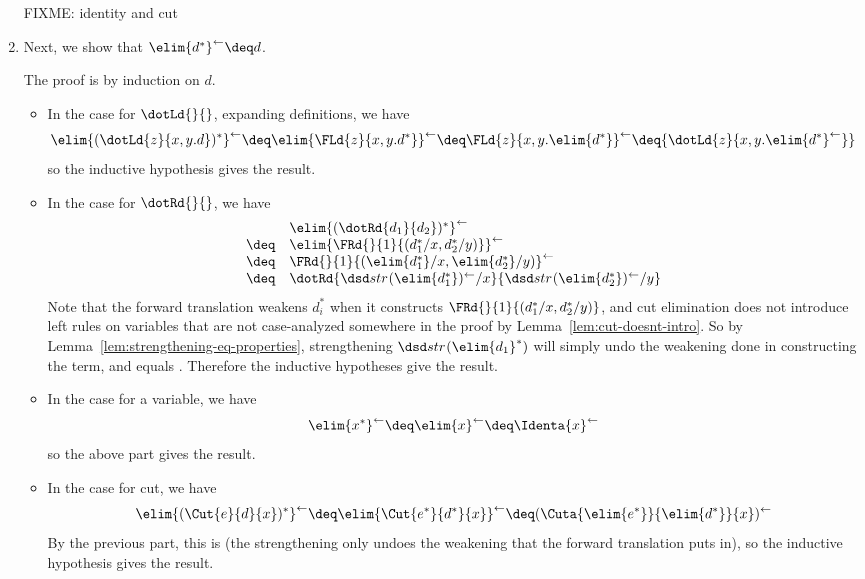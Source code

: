 \begin{enumerate}
FIXME: identity and cut

\item Next, we show that $\backtrf{{\elim{d^*}}} \deq d$.

The proof is by induction on $d$.  

\begin{itemize}
\item In the case for $\dotLd{}{}$, expanding definitions, we have
\[
\backtrf{\elim{(\dotLd{z}{x,y.d})^*}} \deq
\backtrf{\elim{\FLd{z}{x,y.d^*}}} \deq 
\backtrf{\FLd{z}{x,y.\elim{d^*}}} \deq
{\dotLd{z}{x,y.\backtrf{\elim{d^*}}}}
\]
so the inductive hypothesis gives the result.  

\item In the case for $\dotRd{}{}$, we have
\[
\begin{array}{ll}
& \backtrf{\elim{(\dotRd{d_1}{d_2})^*}} \\
\deq & \backtrf{\elim{\FRd{}{1}{(d_1^*/x,d_2^*/y)}}} \\
\deq & \backtrf{\FRd{}{1}{(\elim{d_1^*}/x,\elim{d_2^*}/y)}} \\
\deq & \dotRd{\backtrf{\str{}{\elim{d_1^*}}}/x}{\backtrf{\str{}{\elim{d_2^*}}}/y}
\end{array}
\]
Note that the forward translation weakens $d_i^*$ when it constructs 
${\FRd{}{1}{(d_1^*/x,d_2^*/y)}}$, and cut elimination does not introduce
left rules on variables that are not case-analyzed somewhere in the
proof by Lemma~\ref{lem:cut-doesnt-intro}.  
So by Lemma~\ref{lem:strengthening-eq-properties}, strengthening
$\str{}{\elim{d_1}^*}$ will simply undo the weakening done in
constructing the term, and  equals
.  Therefore the inductive hypotheses give the
result.

\item In the case for a variable, we have
\[
\backtrf{\elim{x^*}} \deq \backtrf{\elim{x}} \deq \backtrf{\Identa{x}}
\]
so the above part gives the result.  

\item In the case for cut, we have
\[
\backtrf{\elim{(\Cut{e}{d}{x})^*}} \deq \backtrf{\elim{\Cut{e^*}{d^*}{x}}}
\deq \backtrf{(\Cuta{\elim{e^*}}{\elim{d^*}}{x})}
\]
By the previous part, this is
 (the strengthening
only undoes the weakening that the forward translation puts in), so the
inductive hypothesis gives the result.
\end{itemize}



\end{enumerate}

